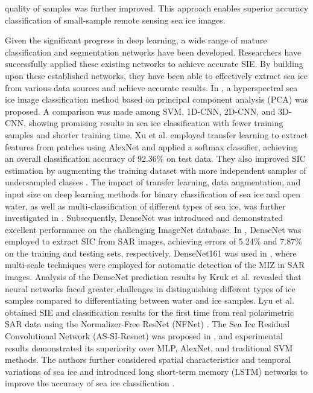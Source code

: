 quality of samples was further improved. This approach enables superior accuracy classification of small-sample remote sensing sea ice images.


Given the significant progress in deep learning, a wide range of mature classification and segmentation networks have been developed. Researchers have successfully applied these existing networks to achieve accurate SIE. By building upon these established networks, they have been able to effectively extract sea ice from various data sources and achieve accurate results. In \cite{86han2021hyperspectral}, a hyperspectral sea ice image classification method based on principal component analysis (PCA) was proposed. A comparison was made among SVM, 1D-CNN, 2D-CNN, and 3D-CNN, showing promising results in sea ice classification with fewer training samples and shorter training time. Xu et al. \cite{77xu2017sea} employed transfer learning to extract features from patches using AlexNet and applied a softmax classifier, achieving an overall classification accuracy of 92.36\% on test data. They also improved SIC estimation by augmenting the training dataset with more independent samples of undersampled classes \cite{80xu2019impact}. The impact of transfer learning, data augmentation, and input size on deep learning methods for binary classification of sea ice and open water, as well as multi-classification of different types of sea ice, was further investigated in \cite{102khaleghian2021sea}. Subsequently, DenseNet \cite{73huang2017densely} was introduced and demonstrated excellent performance on the challenging ImageNet database. In \cite{72cooke2019estimating}, DenseNet was employed to extract SIC from SAR images, achieving errors of 5.24\% and 7.87\% on the training and testing sets, respectively. DenseNet161 was used in \cite{100nagi2020multi}, where multi-scale techniques were employed for automatic detection of the MIZ in SAR images. Analysis of the DenseNet prediction results by Kruk et al. \cite{93kruk2020proof} revealed that neural networks faced greater challenges in distinguishing different types of ice samples compared to differentiating between water and ice samples. Lyu et al. \cite{110lyu2022eastern} obtained SIE and classification results for the first time from real polarimetric SAR data using the Normalizer-Free ResNet (NFNet) \cite{109brock2021high}. The Sea Ice Residual Convolutional Network (AS-SI-Resnet) was proposed in \cite{115song2018residual}, and experimental results demonstrated its superiority over MLP, AlexNet, and traditional SVM methods. The authors further considered spatial characteristics and temporal variations of sea ice and introduced long short-term memory (LSTM) networks to improve the accuracy of sea ice classification \cite{116song2021automatic}.


